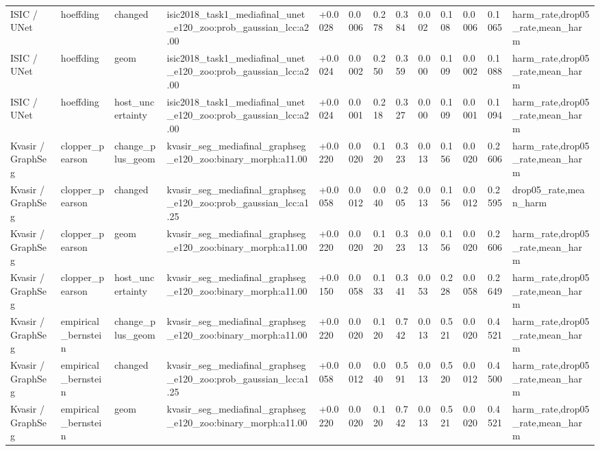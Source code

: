 \begin{table}[t]
\begin{tabular}{lllllllllllll}
ISIC / UNet & hoeffding & changed & isic2018\_task1\_mediafinal\_unet\_e120\_zoo:prob\_gaussian\_lcc:a2.00 & +0.0028 & 0.0006 & 0.278 & 0.384 & 0.002 & 0.108 & 0.0006 & 0.1065 & harm\_rate,drop05\_rate,mean\_harm \\
ISIC / UNet & hoeffding & geom & isic2018\_task1\_mediafinal\_unet\_e120\_zoo:prob\_gaussian\_lcc:a2.00 & +0.0024 & 0.0002 & 0.250 & 0.359 & 0.000 & 0.109 & 0.0002 & 0.1088 & harm\_rate,drop05\_rate,mean\_harm \\
ISIC / UNet & hoeffding & host\_uncertainty & isic2018\_task1\_mediafinal\_unet\_e120\_zoo:prob\_gaussian\_lcc:a2.00 & +0.0024 & 0.0001 & 0.218 & 0.327 & 0.000 & 0.109 & 0.0001 & 0.1094 & harm\_rate,drop05\_rate,mean\_harm \\
Kvasir / GraphSeg & clopper\_pearson & change\_plus\_geom & kvasir\_seg\_mediafinal\_graphseg\_e120\_zoo:binary\_morph:a11.00 & +0.0220 & 0.0020 & 0.120 & 0.323 & 0.013 & 0.156 & 0.0020 & 0.2606 & harm\_rate,drop05\_rate,mean\_harm \\
Kvasir / GraphSeg & clopper\_pearson & changed & kvasir\_seg\_mediafinal\_graphseg\_e120\_zoo:prob\_gaussian\_lcc:a1.25 & +0.0058 & 0.0012 & 0.040 & 0.205 & 0.013 & 0.156 & 0.0012 & 0.2595 & drop05\_rate,mean\_harm \\
Kvasir / GraphSeg & clopper\_pearson & geom & kvasir\_seg\_mediafinal\_graphseg\_e120\_zoo:binary\_morph:a11.00 & +0.0220 & 0.0020 & 0.120 & 0.323 & 0.013 & 0.156 & 0.0020 & 0.2606 & harm\_rate,drop05\_rate,mean\_harm \\
Kvasir / GraphSeg & clopper\_pearson & host\_uncertainty & kvasir\_seg\_mediafinal\_graphseg\_e120\_zoo:binary\_morph:a11.00 & +0.0150 & 0.0058 & 0.133 & 0.341 & 0.053 & 0.228 & 0.0058 & 0.2649 & harm\_rate,drop05\_rate,mean\_harm \\
Kvasir / GraphSeg & empirical\_bernstein & change\_plus\_geom & kvasir\_seg\_mediafinal\_graphseg\_e120\_zoo:binary\_morph:a11.00 & +0.0220 & 0.0020 & 0.120 & 0.742 & 0.013 & 0.521 & 0.0020 & 0.4521 & harm\_rate,drop05\_rate,mean\_harm \\
Kvasir / GraphSeg & empirical\_bernstein & changed & kvasir\_seg\_mediafinal\_graphseg\_e120\_zoo:prob\_gaussian\_lcc:a1.25 & +0.0058 & 0.0012 & 0.040 & 0.591 & 0.013 & 0.520 & 0.0012 & 0.4500 & harm\_rate,drop05\_rate,mean\_harm \\
Kvasir / GraphSeg & empirical\_bernstein & geom & kvasir\_seg\_mediafinal\_graphseg\_e120\_zoo:binary\_morph:a11.00 & +0.0220 & 0.0020 & 0.120 & 0.742 & 0.013 & 0.521 & 0.0020 & 0.4521 & harm\_rate,drop05\_rate,mean\_harm \\

\end{tabular}
\end{table}

